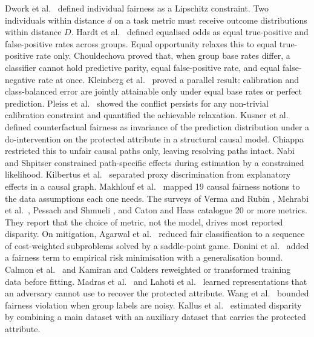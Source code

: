 \documentclass[acmsmall,nonacm,review,anonymous]{acmart}
\newcommand{\1}[1]{\mathbf{1}\!\left\{#1\right\}}
\begin{document}
Dwork et al.\ \cite{dwork2012} defined individual fairness as a Lipschitz constraint. Two individuals within distance $d$ on a task metric must receive outcome distributions within distance $D$. Hardt et al.\ \cite{hardt2016} defined equalised odds as equal true-positive and false-positive rates across groups. Equal opportunity relaxes this to equal true-positive rate only. Chouldechova \cite{chouldechova2017} proved that, when group base rates differ, a classifier cannot hold predictive parity, equal false-positive rate, and equal false-negative rate at once. Kleinberg et al.\ \cite{kleinberg2017} proved a parallel result: calibration and class-balanced error are jointly attainable only under equal base rates or perfect prediction. Pleiss et al.\ \cite{pleiss2017} showed the conflict persists for any non-trivial calibration constraint and quantified the achievable relaxation. Kusner et al.\ \cite{kusner2017} defined counterfactual fairness as invariance of the prediction distribution under a $\mathrm{do}$-intervention on the protected attribute in a structural causal model. Chiappa \cite{chiappa2019} restricted this to unfair causal paths only, leaving resolving paths intact. Nabi and Shpitser \cite{nabi2018} constrained path-specific effects during estimation by a constrained likelihood. Kilbertus et al.\ \cite{kilbertus2017} separated proxy discrimination from explanatory effects in a causal graph. Makhlouf et al.\ \cite{makhlouf2020} mapped 19 causal fairness notions to the data assumptions each one needs. The surveys of Verma and Rubin \cite{verma2018}, Mehrabi et al.\ \cite{mehrabi2021}, Pessach and Shmueli \cite{pessach2022}, and Caton and Haas \cite{caton2024} catalogue 20 or more metrics. They report that the choice of metric, not the model, drives most reported disparity. On mitigation, Agarwal et al.\ \cite{agarwal2018} reduced fair classification to a sequence of cost-weighted subproblems solved by a saddle-point game. Donini et al.\ \cite{donini2018} added a fairness term to empirical risk minimisation with a generalisation bound. Calmon et al.\ \cite{calmon2017} and Kamiran and Calders \cite{kamiran2012} reweighted or transformed training data before fitting. Madras et al.\ \cite{madras2018} and Lahoti et al.\ \cite{lahoti2020} learned representations that an adversary cannot use to recover the protected attribute. Wang et al.\ \cite{wang2020} bounded fairness violation when group labels are noisy. Kallus et al.\ \cite{kallus2022} estimated disparity by combining a main dataset with an auxiliary dataset that carries the protected attribute.
\end{document}
